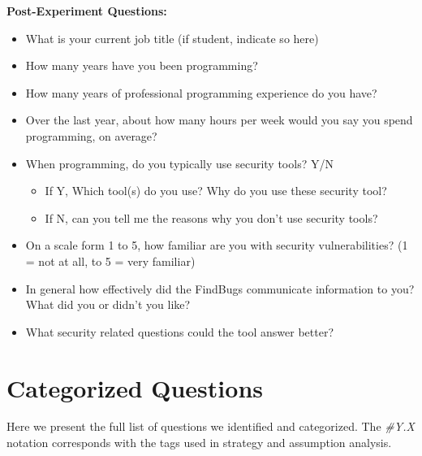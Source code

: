 \documentclass[10pt,journal,compsoc]{IEEEtran}
\begin{document}
\textbf{Post-Experiment Questions:}
\begin{itemize}
\item What is your current job title (if student, indicate so here)
\item How many years have you been programming?
\item How many years of professional programming experience do you have?
\item Over the last year, about how many hours per week would you say you spend programming, on
average?
\item When programming, do you typically use security tools? Y/N
\begin{itemize}
	\item If Y, Which tool(s) do you use? Why do you use these security tool?
	\item If N, can you tell me the reasons why you don't use security tools?
\end{itemize}
\item On a scale form 1 to 5, how familiar are you with security vulnerabilities?
(1 = not at all, to 5 = very familiar)
\item In general how effectively did the FindBugs communicate information to you? What did you or didn't you like?
\item What security related questions could the tool answer better?
\end{itemize}


\section*{Categorized Questions}
Here we present the full list of questions we identified and categorized. 
The \textit{\#Y.X} notation corresponds with the tags used in strategy and assumption analysis.
\end{document}
